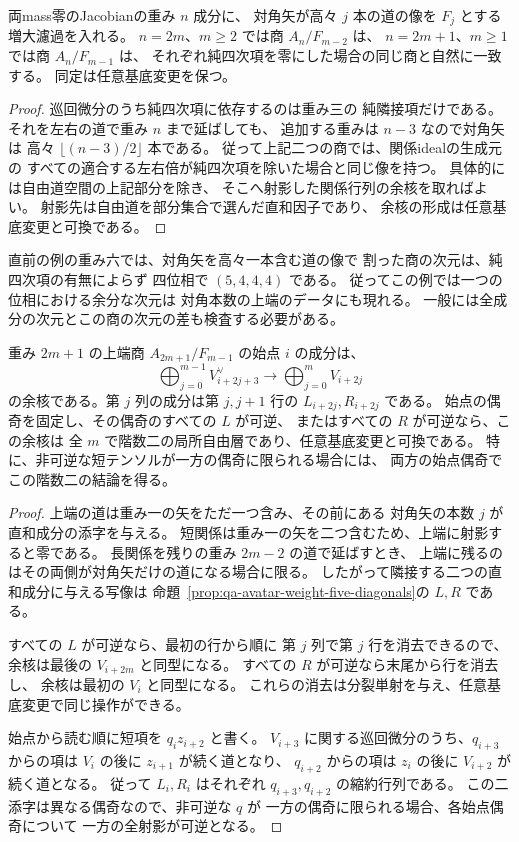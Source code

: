 \begin{corollary}[各重みの対角本数上端の不変性]
\label{cor:qa-avatar-top-diagonal-filtration}
両mass零のJacobianの重み $n$ 成分に、
対角矢が高々 $j$ 本の道の像を $F_j$ とする増大濾過を入れる。
$n=2m$、$m\geq2$ では商 $A_n/F_{m-2}$ は、
$n=2m+1$、$m\geq1$ では商 $A_n/F_{m-1}$ は、
それぞれ純四次項を零にした場合の同じ商と自然に一致する。
同定は任意基底変更を保つ。
\end{corollary}
\begin{proof}
巡回微分のうち純四次項に依存するのは重み三の
純隣接項だけである。それを左右の道で重み $n$ まで延ばしても、
追加する重みは $n-3$ なので対角矢は
高々 $\lfloor(n-3)/2\rfloor$ 本である。
従って上記二つの商では、関係idealの生成元の
すべての適合する左右倍が純四次項を除いた場合と同じ像を持つ。
具体的には自由道空間の上記部分を除き、
そこへ射影した関係行列の余核を取ればよい。
射影先は自由道を部分集合で選んだ直和因子であり、
余核の形成は任意基底変更と可換である。
\end{proof}

直前の例の重み六では、対角矢を高々一本含む道の像で
割った商の次元は、純四次項の有無によらず
四位相で $(5,4,4,4)$ である。
従ってこの例では一つの位相における余分な次元は
対角本数の上端のデータにも現れる。
一般には全成分の次元とこの商の次元の差も検査する必要がある。

\begin{corollary}[奇数重みの上端商と片側可逆性]
\label{cor:qa-avatar-odd-top-chain}
重み $2m+1$ の上端商 $A_{2m+1}/F_{m-1}$ の始点 $i$ の成分は、
\[
 \bigoplus_{j=0}^{m-1}V_{i+2j+3}^{\vee}
 \longrightarrow \bigoplus_{j=0}^{m}V_{i+2j}
\]
の余核である。第 $j$ 列の成分は第 $j,j+1$ 行の
$L_{i+2j},R_{i+2j}$ である。
始点の偶奇を固定し、その偶奇のすべての $L$ が可逆、
またはすべての $R$ が可逆なら、この余核は
全 $m$ で階数二の局所自由層であり、任意基底変更と可換である。
特に、非可逆な短テンソルが一方の偶奇に限られる場合には、
両方の始点偶奇でこの階数二の結論を得る。
\end{corollary}
\begin{proof}
上端の道は重み一の矢をただ一つ含み、その前にある
対角矢の本数 $j$ が直和成分の添字を与える。
短関係は重み一の矢を二つ含むため、上端に射影すると零である。
長関係を残りの重み $2m-2$ の道で延ばすとき、
上端に残るのはその両側が対角矢だけの道になる場合に限る。
したがって隣接する二つの直和成分に与える写像は
命題~\ref{prop:qa-avatar-weight-five-diagonals}の $L,R$ である。

すべての $L$ が可逆なら、最初の行から順に
第 $j$ 列で第 $j$ 行を消去できるので、
余核は最後の $V_{i+2m}$ と同型になる。
すべての $R$ が可逆なら末尾から行を消去し、
余核は最初の $V_i$ と同型になる。
これらの消去は分裂単射を与え、任意基底変更で同じ操作ができる。

始点から読む順に短項を $q_i z_{i+2}$ と書く。
$V_{i+3}$ に関する巡回微分のうち、$q_{i+3}$ からの項は
$V_i$ の後に $z_{i+1}$ が続く道となり、
$q_{i+2}$ からの項は $z_i$ の後に $V_{i+2}$ が続く道となる。
従って $L_i,R_i$ はそれぞれ $q_{i+3},q_{i+2}$ の縮約行列である。
この二添字は異なる偶奇なので、非可逆な $q$ が
一方の偶奇に限られる場合、各始点偶奇について
一方の全射影が可逆となる。
\end{proof}

